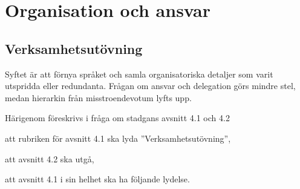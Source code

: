 \documentclass{article}
\begin{document}
\section{Organisation och ansvar}
\subsection{Verksamhetsutövning}
Syftet är att förnya språket och samla organisatoriska detaljer som varit utspridda eller redundanta.
Frågan om ansvar och delegation görs mindre stel, medan hierarkin från misstroendevotum lyfts upp.

Härigenom föreskrivs i fråga om stadgans avsnitt 4.1 och 4.2
\begin{dels}
    \item att rubriken för avsnitt 4.1 ska lyda ''Verksamhetsutövning'',
    \item att avsnitt 4.2 ska utgå,
    \item att avsnitt 4.1 i sin helhet ska ha följande lydelse.
\end{dels}
\end{document}
